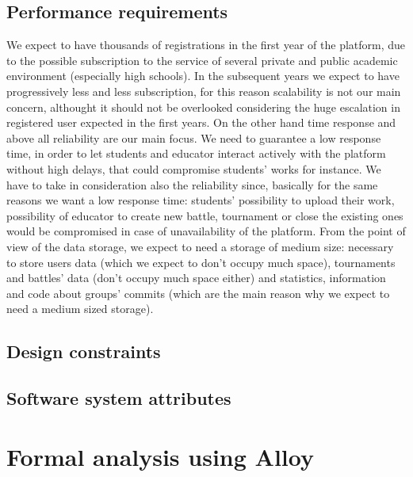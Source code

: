 \documentclass{article}
\begin{document}
{\begin{xltabular}{\textwidth}
            \end{xltabular}
    \subsection{Performance requirements}
        We expect to have thousands of registrations in the first year of the platform, due to the possible
        subscription to the service of several private and public academic environment (especially high schools).
        In the subsequent years we expect to have progressively less and less subscription, for this reason scalability
        is not our main concern, althought it should not be overlooked considering the huge escalation in registered
        user expected in the first years. On the other hand time response and above all reliability are our main focus.
        We need to guarantee a low response time, in order to let students and educator interact actively with the platform
        without high delays, that could compromise students' works for instance. We have to take in consideration
        also the reliability since, basically for the same reasons we want a low response time: students' possibility
        to upload their work, possibility of educator to create new battle, tournament or close the existing ones
        would be compromised in case of unavailability of the platform.
        From the point of view of the data storage, we expect to need a storage of medium size: necessary to store
        users data (which we expect to don't occupy much space), tournaments and battles' data (don't occupy much space either)
        and statistics, information and code about groups' commits (which are the main reason why we expect to need a
        medium sized storage).
\subsection{Design constraints}
\subsection{Software system attributes}

\section{Formal analysis using Alloy}

}
\end{document}
